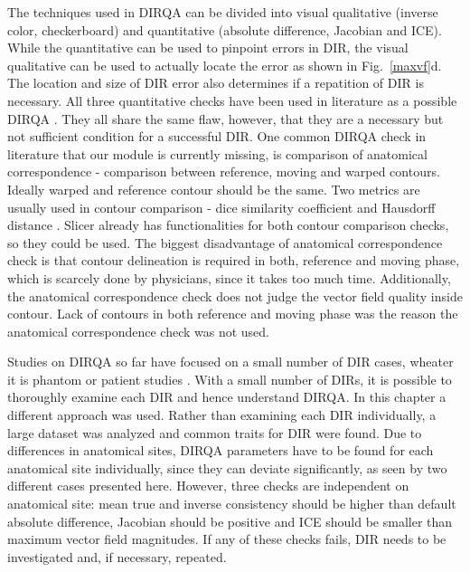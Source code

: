 The techniques used in DIRQA can be divided into visual qualitative (inverse color, checkerboard) and quantitative (absolute difference, Jacobian and ICE). While the quantitative can be used to pinpoint errors in DIR, the visual qualitative
can be used to actually locate the error as shown in Fig.~\ref{maxvf}d. The location and size of DIR error also determines if a repatition of DIR is necessary.
All three quantitative checks have been used in literature as a possible DIRQA \cite{Varadhan2013, Leow2007, Christensen2001, Bender2009}.
They all share the same flaw, however, that they are a necessary but not sufficient condition for a successful DIR. 
One common DIRQA check in literature that our module is currently missing, is comparison of anatomical correspondence - 
comparison between reference, moving and warped contours. Ideally warped and reference contour should be the same. Two metrics are usually used in contour comparison -
dice similarity coefficient \cite{Varadhan2013} and Hausdorff distance \cite{Huttenlocher1993}. Slicer already has functionalities for both contour comparison checks, so they could be used. 
The biggest disadvantage of anatomical correspondence check is that contour delineation is required in both, reference and moving phase, which is scarcely done by physicians, 
since it takes too much time. Additionally, the anatomical correspondence check does not judge the vector field quality inside contour.
Lack of contours in both reference and moving phase was the reason the anatomical correspondence check was not used.

Studies on DIRQA so far have focused on a small number of DIR cases, wheater it is phantom \cite{Mutic2001,Moore2004} or patient studies \cite{Wu2008, Varadhan2013}. With a small number of DIRs,
it is possible to thoroughly examine each DIR and hence understand DIRQA. In this chapter a different approach was
used. Rather than examining each DIR individually, a large dataset was analyzed and common traits for DIR were found. Due to differences in anatomical sites, 
DIRQA parameters have to be found for each anatomical site individually, since they can
deviate significantly, as seen by two different cases presented here. However, three checks are independent on anatomical site: mean true and inverse consistency should be higher than 
default absolute difference, Jacobian should be positive and ICE should be smaller than maximum vector field magnitudes. 
If any of these checks fails, DIR needs to be investigated and, if necessary, repeated.

